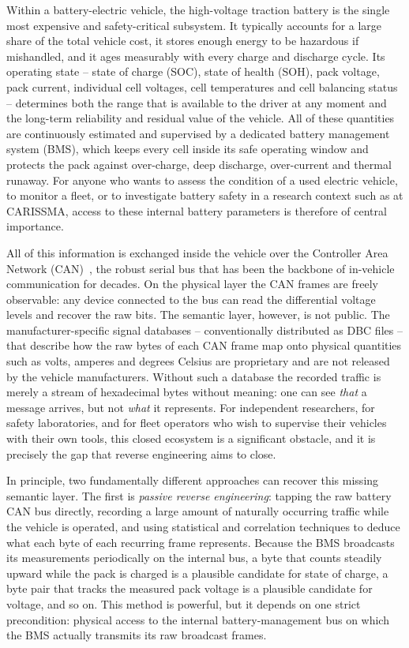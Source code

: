 \documentclass[11pt,a4paper,oneside,parskip=half]{scrreprt}
\begin{document}
Within a battery-electric vehicle, the high-voltage traction battery is the single most expensive and safety-critical subsystem. It typically accounts for a large share of the total vehicle cost, it stores enough energy to be hazardous if mishandled, and it ages measurably with every charge and discharge cycle. Its operating state -- state of charge (SOC), state of health (SOH), pack voltage, pack current, individual cell voltages, cell temperatures and cell balancing status -- determines both the range that is available to the driver at any moment and the long-term reliability and residual value of the vehicle. All of these quantities are continuously estimated and supervised by a dedicated battery management system (BMS), which keeps every cell inside its safe operating window and protects the pack against over-charge, deep discharge, over-current and thermal runaway. For anyone who wants to assess the condition of a used electric vehicle, to monitor a fleet, or to investigate battery safety in a research context such as at CARISSMA, access to these internal battery parameters is therefore of central importance.

All of this information is exchanged inside the vehicle over the Controller Area Network (CAN)~\cite{iso11898}, the robust serial bus that has been the backbone of in-vehicle communication for decades. On the physical layer the CAN frames are freely observable: any device connected to the bus can read the differential voltage levels and recover the raw bits. The semantic layer, however, is not public. The manufacturer-specific signal databases -- conventionally distributed as DBC files -- that describe how the raw bytes of each CAN frame map onto physical quantities such as volts, amperes and degrees Celsius are proprietary and are not released by the vehicle manufacturers. Without such a database the recorded traffic is merely a stream of hexadecimal bytes without meaning: one can see \emph{that} a message arrives, but not \emph{what} it represents. For independent researchers, for safety laboratories, and for fleet operators who wish to supervise their vehicles with their own tools, this closed ecosystem is a significant obstacle, and it is precisely the gap that reverse engineering aims to close.

In principle, two fundamentally different approaches can recover this missing semantic layer. The first is \textit{passive reverse engineering}: tapping the raw battery CAN bus directly, recording a large amount of naturally occurring traffic while the vehicle is operated, and using statistical and correlation techniques to deduce what each byte of each recurring frame represents. Because the BMS broadcasts its measurements periodically on the internal bus, a byte that counts steadily upward while the pack is charged is a plausible candidate for state of charge, a byte pair that tracks the measured pack voltage is a plausible candidate for voltage, and so on. This method is powerful, but it depends on one strict precondition: physical access to the internal battery-management bus on which the BMS actually transmits its raw broadcast frames.
\end{document}

